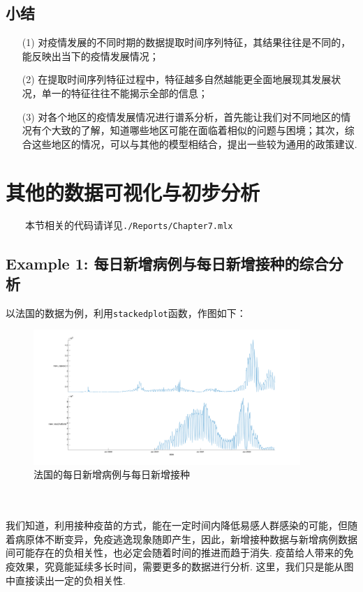 \documentclass[a4paper, titlepage]{article}
\begin{document}
    \subsection{小结}
    \begin{enumerate}
        \item [(1)] 对疫情发展的不同时期的数据提取时间序列特征，其结果往往是不同的，能反映出当下的疫情发展情况；
        \item [(2)] 在提取时间序列特征过程中，特征越多自然越能更全面地展现其发展状况，单一的特征往往不能揭示全部的信息；
        \item [(3)] 对各个地区的疫情发展情况进行谱系分析，首先能让我们对不同地区的情况有个大致的了解，知道哪些地区可能在面临着相似的问题与困境；其次，综合这些地区的情况，可以与其他的模型相结合，提出一些较为通用的政策建议.
    \end{enumerate}
    \newpage
    \section{其他的数据可视化与初步分析}\label{可视化}
    　　本节相关的代码请详见\texttt{./Reports/Chapter7.mlx}
    \subsection{Example 1: 每日新增病例与每日新增接种的综合分析}
        以法国的数据为例，利用\texttt{stackedplot}函数，作图如下：\\
        \begin{minipage}{\textwidth}
            \begin{figure}[H]
                \centering
                \includegraphics[width=0.9\textwidth]{./images/France_CasesAndVaccinations.png}
                \vspace{-1.5em}
                \caption{法国的每日新增病例与每日新增接种}
                \label{images:France_CasesAndVaccinations}
            \end{figure}
        \end{minipage}\\\quad\\
        我们知道，利用接种疫苗的方式，能在一定时间内降低易感人群感染的可能，但随着病原体不断变异，免疫逃逸现象随即产生，因此，新增接种数据与新增病例数据间可能存在的负相关性，也必定会随着时间的推进而趋于消失. 疫苗给人带来的免疫效果，究竟能延续多长时间，需要更多的数据进行分析. 这里，我们只是能从图中直接读出一定的负相关性.
        
\end{document}
